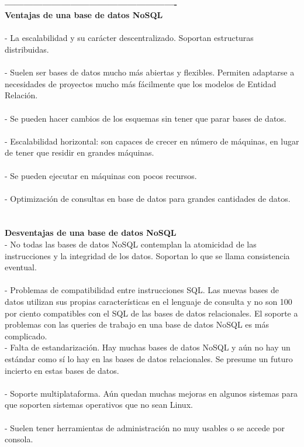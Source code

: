 \documentclass[twoside,twocolumn]{article}
\begin{document}
\begin{flushright}
\begin{itemize}
\textbf{}\\
\textbf{-------------------------------------------------------}\\

\textbf{Ventajas de una base de datos NoSQL}\\
\textbf{}\\
-	La escalabilidad y su carácter descentralizado. Soportan estructuras distribuidas.\\
\textbf{}\\

-	Suelen ser bases de datos mucho más abiertas y flexibles. Permiten adaptarse a necesidades de proyectos mucho más fácilmente que los modelos de Entidad Relación.\\
\textbf{}\\

-	Se pueden hacer cambios de los esquemas sin tener que parar bases de datos.\\
\textbf{}\\
-	Escalabilidad horizontal: son capaces de crecer en número de máquinas, en lugar de tener que residir en grandes máquinas.\\
\textbf{}\\
-	Se pueden ejecutar en máquinas con pocos recursos.\\
\textbf{}\\
-	Optimización de consultas en base de datos para grandes cantidades de datos.\\

\textbf{}\\
\textbf{}\\
\textbf{Desventajas de una base de datos NoSQL}\\

-	No todas las bases de datos NoSQL contemplan la atomicidad de las instrucciones y la integridad de los datos. Soportan lo que se llama consistencia eventual.\\
\textbf{}\\
-	Problemas de compatibilidad entre instrucciones SQL. Las nuevas bases de datos utilizan sus propias características en el lenguaje de consulta y no son 100 por ciento compatibles con el SQL de las bases de datos
 relacionales. El soporte a problemas con las queries de trabajo en una base de datos NoSQL es más complicado.
\textbf{}\\
-	Falta de estandarización. Hay muchas bases de datos NoSQL y aún no hay un estándar como sí lo hay en las bases de datos relacionales. Se presume un futuro incierto en estas bases de datos.\\
\textbf{}\\
-	Soporte multiplataforma. Aún quedan muchas mejoras en algunos sistemas para que soporten sistemas operativos que no sean Linux.\\
\textbf{}\\
-	Suelen tener herramientas de administración no muy usables o se accede por consola.\\


\end{itemize}
\end{flushright}
\end{document}
